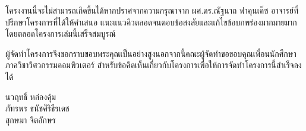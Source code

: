 \documentclass[12pt,oneside,openright,a4paper]{cpe-thai-project}
\begin{document}
\endabstract


\preface

โครงงานนี้จะไม่สามารถเกิดขึ้นได้หากปราศจากความกรุณาจาก ผศ.ดร.ณัฐนาถ ฟาคุนเด๊ซ อาจารย์ที่ปรึกษาโครงการที่ได้ให้คำเสนอ
\newline
แนะแนวคิวตลอดจนตอบข้อสงสัยและแก้ไขข้อบกพร่องมากมายมากโดยตลอดโครงการเล่มนี้เสร็จสมบูรณ์
\par\setlength{\parindent}{5ex}
ผู้จัดทำโครงการจึงขอกราบขอบพระคุณเป็นอย่างสูงนอกจากนี้คณะผู้จัดทำขอขอบคุณเพื่อนนักศึกษาภาควิชาวิศวกรรมคอมพิวเตอร์
\newline
สำหรับข้อคิดเห็นเกี่ยวกับโครงการเพื่อให้การจัดทำโครงการนี้สำเร็จลงได้

\begin{flushright}
นวฤทธิ์ หล่องคุ้ม 
\\ภัทรพร 	ธนัชศิริธีรเดช
\\สุกษมา 	จิตอักษร
\end{flushright}
  
\tableofcontents                    
\listoftables
\listoffigures                      




\end{document}
